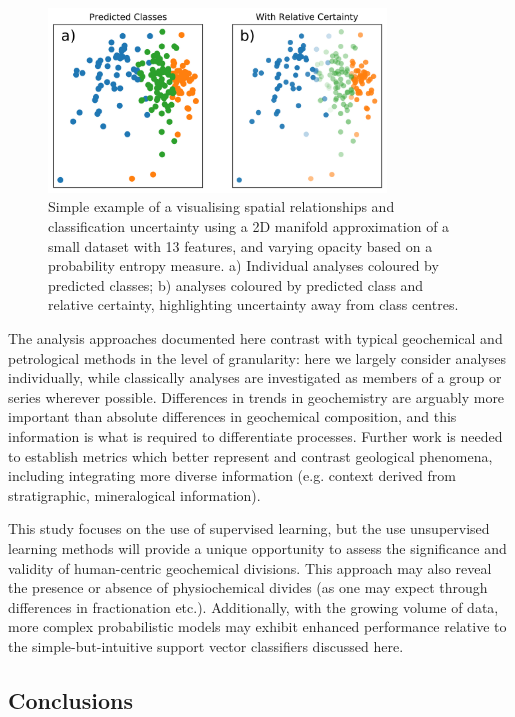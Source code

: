 \documentclass[a4,10pt]{article}
\begin{document}
\begin{multicols*}{2}[]
	\begin{figure}[ht]
		\centering
		\includegraphics[width=0.8\textwidth]{./figures/manifold_uncertainty_noticks.png}
		\caption[]{Simple example of a visualising spatial relationships and classification uncertainty using a 2D manifold approximation of a small dataset with 13 features, and varying opacity based on a probability entropy measure.  a) Individual analyses coloured by predicted classes; b) analyses coloured by predicted class and relative certainty, highlighting uncertainty away from class centres.}
	\end{figure}
	
	The analysis approaches documented here contrast with typical geochemical and petrological methods in the level of granularity: here we largely consider analyses individually, while classically analyses are investigated as members of a group or series wherever possible. Differences in trends in geochemistry are arguably more important than absolute differences in geochemical composition, and this information is what is required to differentiate processes. Further work is needed to establish metrics which better represent and contrast geological phenomena, including integrating more diverse information (e.g. context derived from stratigraphic, mineralogical information).
	
	This study focuses on the use of supervised learning, but the use unsupervised learning methods will provide a unique opportunity to assess the significance and validity of human-centric geochemical divisions. This approach may also reveal the presence or absence of physiochemical divides (as one may expect through differences in fractionation etc.). Additionally, with the growing volume of data, more complex probabilistic models may exhibit enhanced performance relative to the simple-but-intuitive support vector classifiers discussed here. 
	
	\subsection*{Conclusions}
	

\end{multicols*}
\end{document}
